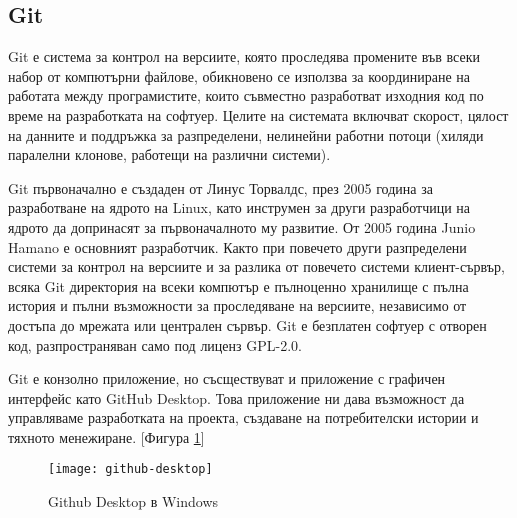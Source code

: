 \subsection{Git}
Git е система за контрол на версиите, която проследява промените във всеки
набор от компютърни файлове, обикновено се използва за координиране на работата
между програмистите, които съвместно разработват изходния код по време на
разработката на софтуер. Целите на системата включват скорост, цялост на
данните и поддръжка за разпределени, нелинейни работни потоци (хиляди паралелни
клонове, работещи на различни системи).

Git първоначално е създаден от Линус Торвалдс, през 2005 година за разработване
на ядрото на Linux, като инструмен за други разработчици на ядрото да
допринасят за първоначалното му развитие. От 2005 година Junio Hamano е основният
разработчик. Както при повечето други разпределени системи за контрол на версиите
и за разлика от повечето системи клиент-сървър, всяка Git директория на всеки
компютър е пълноценно хранилище с пълна история и пълни възможности за
проследяване на версиите, независимо от достъпа до мрежата или централен
сървър. Git е безплатен софтуер с отворен код, разпространяван само под лиценз
GPL-2.0. \cite{git_wikipedia}

Git е конзолно приложение, но съсществуват и приложение с графичен интерфейс
като GitHub Desktop. Това приложение ни дава възможност да управляваме
разработката на проекта, създаване на потребителски истории и тяхното
менежиране. [Фигура \ref{fig:github-desktop}] \cite{github_desktop}

\begin{figure}[!htb]
  \texttt{[image: github-desktop]}
  \centering
  \caption{Github Desktop в Windows}
  \label{fig:github-desktop}
\end{figure}


